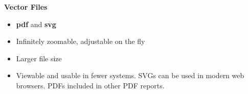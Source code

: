 \documentclass{tufte-handout}
\begin{document}
\textbf{Vector Files}

\begin{itemize}
\itemsep1pt\parskip0pt
\item
  \textbf{pdf} and \textbf{svg}
\item
  Infinitely zoomable, adjustable on the fly
\item
  Larger file size
\item
  Viewable and usable in fewer systems. SVGs can be used in modern web
  browsers. PDFs included in other PDF reports.
\end{itemize}
\end{document}
